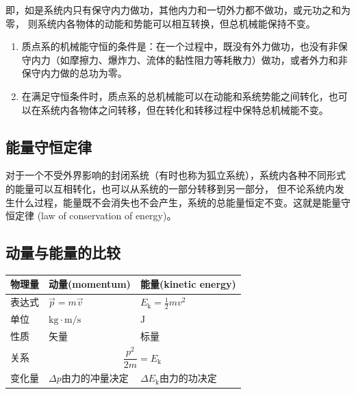 \documentclass[
	12pt, %
	a4paper, %
]{myLegrandOrangeBook}
\begin{document}
即，如是系统内只有保守内力做功，其他内力和一切外力都不做功，或元功之和为零，
则系统内各物体的动能和势能可以相互转换，但总机械能保持不变。

\begin{enumerate}
    \item 质点系的机械能守恒的条件是：在一个过程中，既没有外力做功，也没有非保守内力（如摩擦力、爆炸力、流体的黏性阻力等耗散力）做功，或者外力和非保守内力做的总功为零。
    \item 在满足守恒条件时，质点系的总机械能可以在动能和系统势能之间转化，也可以在系统内各物体之问转移，但在转化和转移过程中保特总机械能不变。
\end{enumerate}

\subsection{能量守恒定律}

对于一个不受外界影响的封闭系统（有时也称为狐立系统），系统内各种不同形式的能量可以互相转化，也可以从系统的一部分转移到另一部分，
但不论系统内发生什么过程，能量既不会消失也不会产生，系统的总能量恒定不变。这就是能量守恒定律 (law of conservation of energy)。

\subsection{动量与能量的比较}

\begin{table}[htbp]
    \centering
    \begin{tabular}{|l|ll|}
        \hline
        \textbf{物理量} & \multicolumn{1}{l|}{\textbf{动量(momentum)}}                    & \textbf{能量(kinetic energy)}      \\ \hline
        表达式          & \multicolumn{1}{l|}{\(\overrightarrow{p} = m\overrightarrow{v}\)} & \(E_{\mathrm{k}} = \frac{1}{2}mv^2\) \\ \hline
        单位  & \multicolumn{1}{l|}{\(\mathrm{kg \cdot m / s}\)} & \(\mathrm{J}\)                  \\ \hline
        性质  & \multicolumn{1}{l|}{矢量}                      & 标量                          \\ \hline
        关系  & \multicolumn{2}{c|}{\(\dfrac{p^2}{2m} = E_{\mathrm{k}}\)}                       \\ \hline
        变化量 & \multicolumn{1}{l|}{\(\Delta p\)由力的冲量决定}         & \(\Delta E_{\mathrm{k}}\)由力的功决定 \\ \hline
    \end{tabular}
\end{table}
\end{document}

